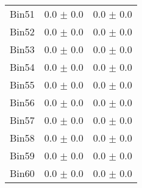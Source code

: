 \begin{tabular}{|c|c|c|}
     Bin51 & 0.0 $\pm$ 0.0 & 0.0 $\pm$ 0.0 \\ \cline{1-3} 
     Bin52 & 0.0 $\pm$ 0.0 & 0.0 $\pm$ 0.0 \\ \cline{1-3} 
     Bin53 & 0.0 $\pm$ 0.0 & 0.0 $\pm$ 0.0 \\ \cline{1-3} 
     Bin54 & 0.0 $\pm$ 0.0 & 0.0 $\pm$ 0.0 \\ \cline{1-3} 
     Bin55 & 0.0 $\pm$ 0.0 & 0.0 $\pm$ 0.0 \\ \cline{1-3} 
     Bin56 & 0.0 $\pm$ 0.0 & 0.0 $\pm$ 0.0 \\ \cline{1-3} 
     Bin57 & 0.0 $\pm$ 0.0 & 0.0 $\pm$ 0.0 \\ \cline{1-3} 
     Bin58 & 0.0 $\pm$ 0.0 & 0.0 $\pm$ 0.0 \\ \cline{1-3} 
     Bin59 & 0.0 $\pm$ 0.0 & 0.0 $\pm$ 0.0 \\ \cline{1-3} 
     Bin60 & 0.0 $\pm$ 0.0 & 0.0 $\pm$ 0.0 \\ \cline{1-3} 
  \end{tabular}

